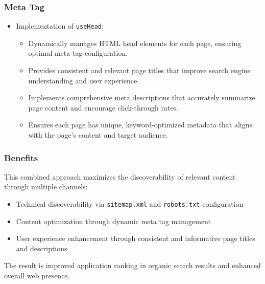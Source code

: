 \subsubsection{Meta Tag}
\begin{itemize}
    \item Implementation of \texttt{useHead}:
            \begin{itemize}
                \item Dynamically manages HTML head elements for each page, ensuring optimal meta tag configuration.
                \item Provides consistent and relevant page titles that improve search engine understanding and user experience.
                \item Implements comprehensive meta descriptions that accurately summarize page content and encourage click-through rates.
                \item Ensures each page has unique, keyword-optimized metadata that aligns with the page's content and target audience.
            \end{itemize}

\end{itemize}


\subsubsection{Benefits}
This combined approach maximizes the discoverability of relevant content through multiple channels:

\begin{itemize}
    \item Technical discoverability via \texttt{sitemap.xml} and \texttt{robots.txt} configuration
    \item Content optimization through dynamic meta tag management
    \item User experience enhancement through consistent and informative page titles and descriptions
\end{itemize}
The result is improved application ranking in organic search results and enhanced overall web presence.



